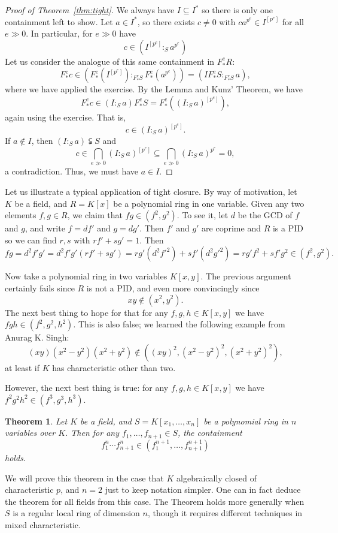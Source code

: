 \documentclass[12pt]{amsart}
\newtheorem{theorem}{Theorem}[section]
\theoremstyle{definition}
\numberwithin{equation}{theorem}
\begin{document}
\begin{proof}[Proof of Theorem~\ref{thm:tight}]
We always have $I\subseteq I^*$ so there is only one containment left to show. Let $a\in I^*$, so there exists $c\neq 0$ with $c a^{p^e} \in I^{[p^e]}$ for all $e \gg 0$. In particular, for $e\gg 0$ have
\[ c \in (I^{[p^e]} :_S a^{p^e})\]
Let us consider the analogue of this same containment in $F^e_*R$:
\[ F^e_*c \in (F^e_*(I^{[p^e]}) :_{F^e_*S} F^e_*(a^{p^e})) = (I F^e_*S :_{F^e_*S} a), \]
where we have applied the exercise. By the Lemma and Kunz' Theorem, we have
\[ F^e_*c \in  (I  :_S a) F^e_*S = F^e_*\left( (I  :_S a)^{[p^e]} \right),\]
again using the exercise. That is,
\[ c \in (I  :_S a)^{[p^e]}.\]
If $a \notin I$, then  $(I :_S a) \subsetneqq S$ and
\[ c\in \bigcap_{e\gg 0} (I :_S a)^{[p^e]} \subseteq  \bigcap_{e\gg 0} (I :_S a)^{p^e} = 0,\]
a contradiction. Thus, we must have $a\in I$.
\end{proof}

Let us illustrate a typical application of tight closure. By way of motivation, let $K$ be a field, and $R=K[x]$ be a polynomial ring in one variable. Given any two elements $f,g\in R$, we claim that $fg\in (f^2,g^2)$. To see it, let $d$ be the GCD of $f$ and $g$, and write $f=d f'$ and $g=dg'$. Then $f'$ and $g'$ are coprime and $R$ is a PID so we can find $r,s$ with $rf'+ sg' = 1$. Then
\[ fg = d^2 f' g' = d^2 f' g' (rf' + sg') = r g' (d^2 f'^2) + s f' (d^2 g'^2) = rg' f^2 + s f' g^2 \in (f^2,g^2).\]

Now take a polynomial ring in two variables $K[x,y]$. The previous argument certainly fails since $R$ is not a PID, and even more convincingly since
\[ xy \notin (x^2,y^2).\]
The next best thing to hope for that for any $f,g,h \in K[x,y]$ 
we have $fgh\in (f^2,g^2,h^2)$. This is also false; we learned the following example from Anurag K. Singh:
\[ (xy)(x^2-y^2)(x^2+y^2) \notin \left( (xy)^2, (x^2-y^2)^2, (x^2+y^2)^2 \right),\]
at least if $K$ has characteristic other than two.
 
 However, the next best thing is true: for any $f,g,h \in K[x,y]$ 
we have $f^2g^2h^2\in (f^3,g^3,h^3)$.

\begin{theorem}\label{thmcontain} Let $K$ be a field, and $S=K[x_1,\dots,x_n]$ be a polynomial ring in $n$ variables over $K$. Then for any $f_1,\dots,f_{n+1}\in S$, the containment 
\[ f_1^n \cdots f_{n+1}^n \in (f_1^{n+1},\dots,f_{n+1}^{n+1})\] holds.
\end{theorem}
We will prove this theorem in the case that $K$ algebraically closed of characteristic $p$, and $n=2$ just to keep notation simpler. One can in fact deduce the theorem for all fields from this case. The Theorem holds more generally when $S$ is a regular local ring of dimension $n$, though it requires different techniques in mixed characteristic.
\end{document}
